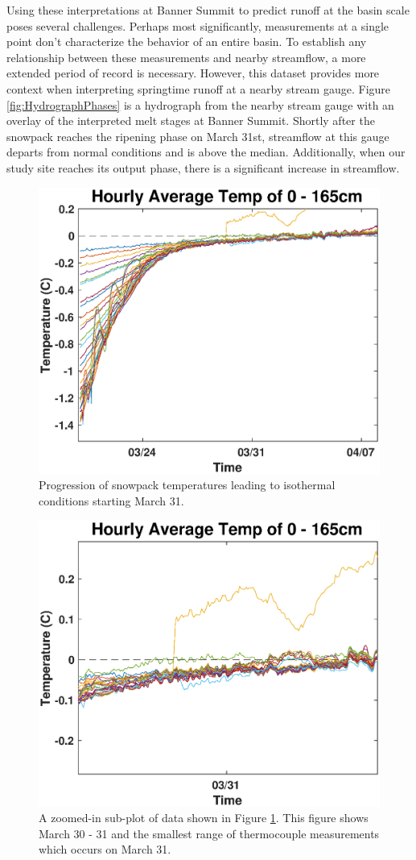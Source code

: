Using these interpretations at Banner Summit to predict runoff at the basin scale poses several challenges. Perhaps most significantly, measurements at a single point don't characterize the behavior of an entire basin. To establish any relationship between these measurements and nearby streamflow, a more extended period of record is necessary. However, this dataset provides more context when interpreting springtime runoff at a nearby stream gauge. Figure \ref{fig:HydrographPhases} is a hydrograph from the nearby stream gauge with an overlay of the interpreted melt stages at Banner Summit. Shortly after the snowpack reaches the ripening phase on March 31st, streamflow at this gauge departs from normal conditions and is above the median. Additionally, when our study site reaches its output phase, there is a significant increase in streamflow.

\begin{figure}
    \centering
    \includegraphics[width=0.7\linewidth]{figures/TCArray/0_165cm_Isothermal.eps}
    \caption{Progression of snowpack temperatures leading to isothermal conditions starting March 31.}
    \label{fig:0_135cm_Isothermal}
 \end{figure}
 
 \begin{figure}
    \centering
    \includegraphics[width=0.7\linewidth]{figures/TCArray/0_165cm_Isothermal_sub.eps}
    \caption{A zoomed-in sub-plot of data shown in Figure \ref{fig:0_135cm_Isothermal}. This figure shows March 30 - 31 and the smallest range of thermocouple measurements which occurs on March 31.}
    \label{fig:0_135cm_Zoom}
 \end{figure}
 

